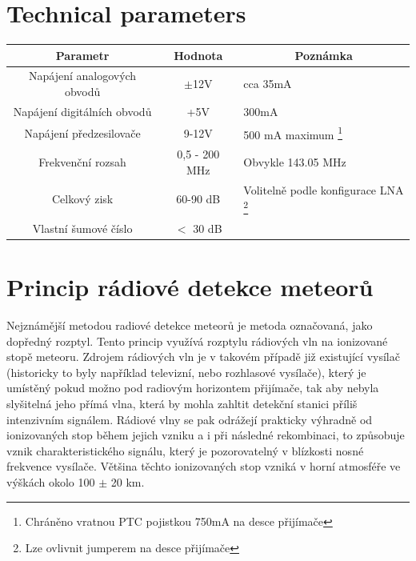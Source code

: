 \documentclass[12pt,a4paper,oneside]{article}
\begin{document}
\section{Technical parameters}
\begin{table}[htbp]
\begin{center}
\begin{tabular}{|c|c|p{5cm}|}
\hline
\multicolumn{1}{|c|}{Parametr} & \multicolumn{1}{|c|}{Hodnota} & \multicolumn{1}{|c|}{Poznámka} \\ \hline
Napájení analogových obvodů & $\pm$12V &  cca 35mA \\ \hline
Napájení digitálních obvodů & +5V &  300mA \\ \hline
Napájení předzesilovače  & 9-12V &  500 mA maximum \footnote{Chráněno vratnou PTC pojistkou 750mA na desce přijímače} \\ \hline
Frekvenční rozsah  & 0,5 - 200 MHz & Obvykle 143.05 MHz \\ \hline
Celkový zisk & 60-90 dB & Volitelně podle konfigurace LNA \footnote{Lze ovlivnit jumperem na desce přijímače}\\ \hline
Vlastní šumové číslo & $<$ 30 dB & \\ \hline
\end{tabular}
\end{center}
\end{table}

\newpage
\section{Princip rádiové detekce meteorů}

Nejznámější metodou radiové detekce meteorů je metoda označovaná, jako dopředný rozptyl. Tento princip využívá rozptylu rádiových vln na ionizované stopě meteoru. Zdrojem rádiových vln je v takovém případě již existující vysílač (historicky to byly například televizní, nebo rozhlasové vysílače), který je umístěný pokud možno pod radiovým horizontem přijímače, tak aby nebyla slyšitelná jeho přímá vlna, která by mohla zahltit detekční stanici příliš intenzivním signálem.  Rádiové vlny se pak odrážejí prakticky výhradně od ionizovaných stop během jejich vzniku a i při následné rekombinaci, to způsobuje vznik charakteristického signálu, který je pozorovatelný v blízkosti nosné frekvence vysílače. Většina těchto ionizovaných stop vzniká v horní atmosféře ve výškách okolo 100 $\pm$ 20 km.  
\end{document}
